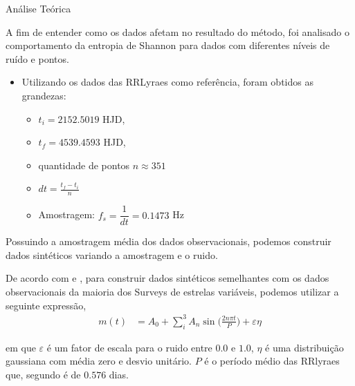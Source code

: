 \documentclass{beamer}
\begin{document}
\begin{frame}[allowframebreaks]{Análise Teórica}

A fim de entender como os dados afetam no resultado do método, foi analisado o comportamento da entropia de Shannon para dados com diferentes níveis de ruído e pontos.

\begin{itemize}
\item Utilizando os dados das RRLyraes como referência, foram obtidos as grandezas:
\begin{itemize}
\item \(t_i = 2152.5019\) HJD,
\item \(t_f = 4539.4593\) HJD,
\item quantidade de pontos \(n \approx 351\)
\item \(dt = \frac{t_f - t_i}{n}\)
\item Amostragem: $f_s = \dfrac{1}{dt} =  0.1473$ Hz
\end{itemize}
\end{itemize}

\framebreak

Possuindo a amostragem média dos dados observacionais, podemos construir dados sintéticos variando a amostragem e o ruido.

\begin{block}

De acordo com \cite{ce} e \cite{entropy}, para construir dados sintéticos semelhantes com os dados observacionais da maioria dos Surveys de estrelas variáveis, podemos utilizar a seguinte expressão,
\begin{align}
m(t) &= A_0 + \sum_i^3 A_n \sin \Big( \frac{2 n \pi t}{P} \Big) + \varepsilon \eta \label{eq:sinal}
\end{align}
\end{block}
em que \(\varepsilon\) é um fator de escala para o ruido entre \(0.0\) e \(1.0\), \(\eta\) é uma distribuição gaussiana com média zero e desvio unitário. \(P\) é o período médio das RRlyraes que, segundo \cite{lyraes} é de \(0.576\) dias.


\framebreak



\end{frame}
\end{document}
